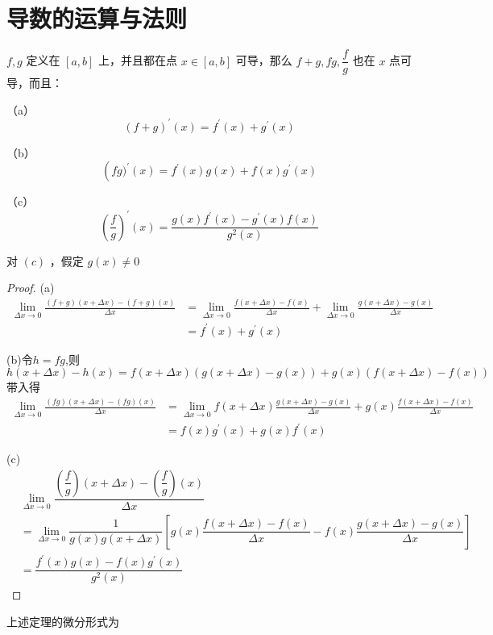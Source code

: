 \section{导数的运算与法则}
\begin{proposition}\label{calofder}
	$f, g$ 定义在 $[a, b]$ 上，并且都在点 $x \in[a, b]$ 可导，那么 $f+g, f g, \dfrac{f}{g}$ 也在 $x$ 点可导，而且：
	
	（a）$$(f+g)^{\prime}(x)=f^{\prime}(x)+g^{\prime}(x)$$
	
	（b）$$\left(f g)^{\prime}(x)=f^{\prime}(x) g(x)+f(x) g^{\prime}(x)\right.$$
	
	（c）$$\left(\dfrac{f}{g}\right)^{\prime}(x)=\dfrac{g(x) f^{\prime}(x)-g^{\prime}(x) f(x)}{g^2(x)}$$
	
	对 $(c)$ ，假定 $g(x) \neq 0$
\end{proposition}

\begin{proof}
	(a) $$\begin{aligned} \lim _{\Delta x \rightarrow 0} \frac{(f+g)(x+\Delta x)-(f+g)(x)}{\Delta x} & =\lim _{\Delta x \rightarrow 0} \frac{f(x+\Delta x)-f(x)}{\Delta x}+\lim _{\Delta x \rightarrow 0} \frac{g(x+\Delta x)-g(x)}{\Delta x} \\ & =f^{\prime}(x)+g^{\prime}(x)\end{aligned}$$
	
	(b)令$h=fg$,则
	$$h(x+\Delta x)-h(x)=f(x+\Delta x)(g(x+\Delta x)-g(x))+g(x)(f(x+\Delta x)-f(x))$$
	带入得
	$$\begin{aligned} \lim _{\Delta x \rightarrow 0} \frac{(f g)(x+\Delta x)-(f g)(x)}{\Delta x} & =\lim _{\Delta x \rightarrow 0} f(x+\Delta x) \frac{g(x+\Delta x)-g(x)}{\Delta x}+g(x) \frac{f(x+\Delta x)-f(x)}{\Delta x} \\ & =f(x) g^{\prime}(x)+g(x) f^{\prime}(x)\end{aligned}$$
	
	(c)$$\begin{aligned}
		&\lim _{\Delta x \rightarrow 0} \dfrac{\left(\dfrac{f}{g}\right)(x+\Delta x)-\left(\dfrac{f}{g}\right)(x)}{\Delta x}\\ & =\lim _{\Delta x \rightarrow 0} \dfrac{1}{g(x) g(x+\Delta x)}\left[g(x) \dfrac{f(x+\Delta x)-f(x)}{\Delta x}-f(x) \dfrac{g(x+\Delta x)-g(x)}{\Delta x}\right] \\
		& =\dfrac{f^{\prime}(x) g(x)-f(x) g^{\prime}(x)}{g^2(x)}
	\end{aligned}$$
	
\end{proof}
上述定理的微分形式为

